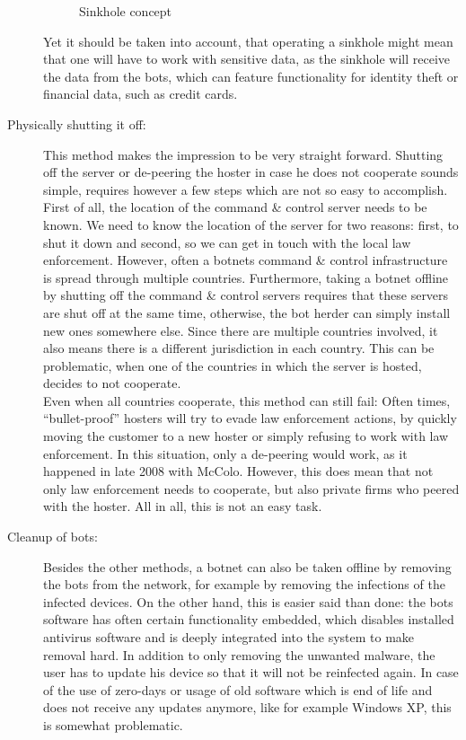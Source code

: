 \documentclass[10pt, a4paper, twocolumn]{article} %
\begin{document}
\begin{description}
\begin{figure}[ht]
  \caption{Sinkhole concept}
\end{figure}

Yet it should be taken into account, that operating a sinkhole might mean that one will have to work with sensitive data, as the sinkhole will receive the data from the bots, which can feature functionality for identity theft or financial data, such as credit cards. 

\item[Physically shutting it off:]
This method makes the impression to be very straight forward. Shutting off the server or de-peering the hoster in case he does not cooperate sounds simple, requires however a few steps which are not so easy to accomplish. First of all, the location of the command \& control server needs to be known. We need to know the location of the server for two reasons: first, to shut it down and second, so we can get in touch with the local law enforcement. However, often a botnets command \& control infrastructure is spread through multiple countries. Furthermore, taking a botnet offline by shutting off the command \& control servers requires that these servers are shut off at the same time, otherwise, the bot herder can simply install new ones somewhere else. Since there are multiple countries involved, it also means there is a different jurisdiction in each country. This can be problematic, when one of the countries in which the server is hosted, decides to not cooperate. \\
Even when all countries cooperate, this method can still fail: Often times, ``bullet-proof'' hosters will try to evade law enforcement actions, by quickly moving the customer to a new hoster or simply refusing to work with law enforcement. In this situation, only a de-peering would work, as it happened in late 2008 with McColo. However, this does mean that not only law enforcement needs to cooperate, but also private firms who peered with the hoster. All in all, this is not an easy task.

\item[Cleanup of bots:]
Besides the other methods, a botnet can also be taken offline by removing the bots from the network, for example by removing the infections of the infected devices. On the other hand, this is easier said than done: the bots software has often certain functionality embedded, which disables installed antivirus software and is deeply integrated into the system to make removal hard. In addition to only removing the unwanted malware, the user has to update his device so that it will not be reinfected again. In case of the use of zero-days or usage of old software which is end of life and does not receive any updates anymore, like for example Windows XP, this is somewhat problematic.

\end{description}
\end{document}
